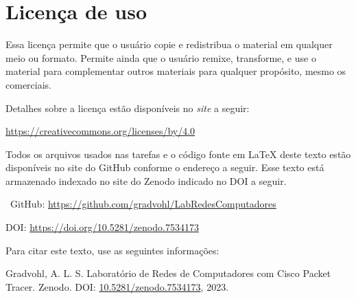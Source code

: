 \chapter*{Licença de uso}\label{chp:licenca}

\doclicenseThis

Essa licença permite que o usuário copie e redistribua o material em qualquer meio ou formato. Permite ainda que o usuário remixe, transforme, e use o material para complementar outros materiais para qualquer propósito, mesmo os comerciais.

 Detalhes sobre a licença estão disponíveis no \textit{site} a seguir:
 \begin{center}
    \url{https://creativecommons.org/licenses/by/4.0}     
 \end{center}

Todos os arquivos usados nas tarefas e o código fonte em \LaTeX{} deste texto estão disponíveis no site do GitHub conforme o endereço a seguir. Esse texto está armazenado indexado no site do Zenodo indicado no DOI a seguir.

\faGithub\ GitHub: \url{https://github.com/gradvohl/LabRedesComputadores}

\def\myDOI{10.5281/zenodo.7534173}
DOI: \url{https://doi.org/\myDOI}%

Para citar este texto, use as seguintes informações:

\noindent
{\sc Gradvohl, A. L. S.} Laboratório de Redes de Computadores com Cisco Packet Tracer. Zenodo. DOI: \href{http://doi.org/\myDOI}{10.5281/zenodo.7534173}, 2023.
